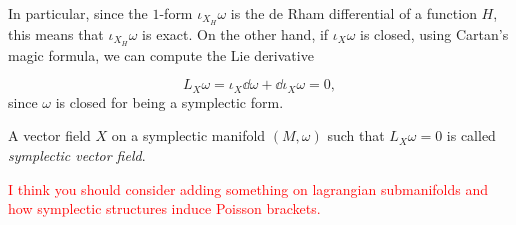 In particular, since the $1$-form $\iota_{X_H} \omega$ is the de Rham differential of a function $H$, this means that $\iota_{X_H} \omega$ is exact.
On the other hand, if $\iota_X \omega$ is closed, using Cartan's magic formula, we can compute the Lie derivative

\begin{equation*}
    L_X \omega = \iota_X \dd \omega + \dd \iota_X \omega = 0,
\end{equation*}
since $\omega$ is closed for being a symplectic form.

\begin{definition}
    A vector field $X$ on a symplectic manifold $(M, \omega)$ such that $L_X \omega = 0$ is called \emph{symplectic vector field}.
\end{definition}

\textcolor{red}{I think you should consider adding something on lagrangian submanifolds and how symplectic structures induce Poisson brackets.}